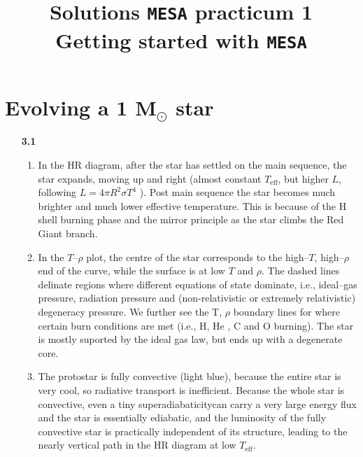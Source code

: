 \documentclass[11pt,a4paper]{article}
\begin{document}
\title{
    \textbf{Solutions \texttt{MESA} practicum 1} \\
    \textbf{\Large Getting started with \texttt{MESA}}
}
\date{}
\maketitle
\vspace{-1cm}


\section{Evolving a 1 \texorpdfstring{M$_\odot$}{Msun} star}


\begin{enumerate}

\item[\bf{3.1}] 
\begin{enumerate}

\item In the HR diagram, after the star has settled on the main sequence, the star expands, moving up and right (almost constant $T_{\mathrm{eff}}$, but higher $L$, following $L = 4\pi R^2\sigma T^4$ ). Post main sequence the star becomes much brighter and much lower effective temperature. This is because of the H shell burning phase and the mirror principle as the star climbs the Red Giant branch.


\item In the $T$–$\rho$ plot, the centre of the star corresponds to the high–$T$, high–$\rho$ end of the curve, while the surface is at low $T$ and $\rho$. The dashed lines delinate regions where different equations of state dominate, i.e., ideal–gas pressure,  radiation pressure and (non-relativistic or extremely relativistic) degeneracy pressure. We further see the T, $\rho$ boundary lines for where certain burn conditions are met (i.e., H, He , C and O burning).
The star is mostly suported by the ideal gas law, but ends up with a degenerate core.


\item The protostar is fully convective (light blue), because the entire star is very cool, so radiative transport is inefficient. Because the whole star is convective, even a tiny superadiabaticitycan carry a very large energy flux and the star is essentially ediabatic, and the luminosity of the fully convective star is practically independent of its structure, leading to the nearly vertical path in the HR diagram at low $T_{\mathrm{eff}}$.



\end{enumerate}
\end{enumerate}
\end{document}

